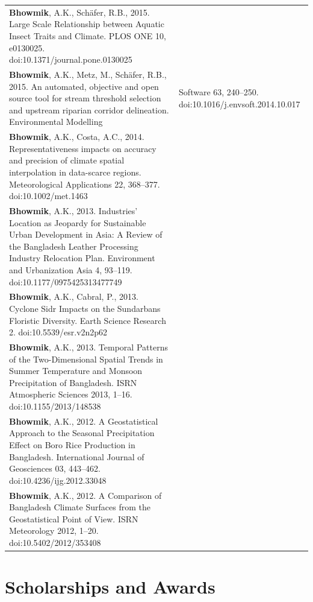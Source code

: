 \begin{table}[hp!]

\label{Table CV5a}

\begin{tabular}{>{\raggedright\arraybackslash}p{14.0cm}}

\textbf{Bhowmik}, A.K., Schäfer, R.B., 2015. Large Scale Relationship between Aquatic Insect Traits and Climate. PLOS ONE 10, e0130025. doi:10.1371/journal.pone.0130025\\[0.3cm]
\textbf{Bhowmik}, A.K., Metz, M., Schäfer, R.B., 2015. An automated, objective and open source tool for stream threshold selection and upstream riparian corridor delineation. Environmental Modelling & Software 63, 240–250. doi:10.1016/j.envsoft.2014.10.017\\[0.3cm]
\textbf{Bhowmik}, A.K., Costa, A.C., 2014. Representativeness impacts on accuracy and precision of climate spatial interpolation in data-scarce regions. Meteorological Applications 22, 368–377. doi:10.1002/met.1463\\[0.3cm]
\textbf{Bhowmik}, A.K., 2013. Industries’ Location as Jeopardy for Sustainable Urban Development in Asia: A Review of the Bangladesh Leather Processing Industry Relocation Plan. Environment and Urbanization Asia 4, 93–119. doi:10.1177/0975425313477749\\[0.3cm]
\textbf{Bhowmik}, A.K., Cabral, P., 2013. Cyclone Sidr Impacts on the Sundarbans Floristic Diversity. Earth Science Research 2. doi:10.5539/esr.v2n2p62\\[0.3cm]
\textbf{Bhowmik}, A.K., 2013. Temporal Patterns of the Two-Dimensional Spatial Trends in Summer Temperature and Monsoon Precipitation of Bangladesh. ISRN Atmospheric Sciences 2013, 1–16. doi:10.1155/2013/148538\\[0.3cm]
\textbf{Bhowmik}, A.K., 2012. A Geostatistical Approach to the Seasonal Precipitation Effect on Boro Rice Production in Bangladesh. International Journal of Geosciences 03, 443–462. doi:10.4236/ijg.2012.33048\\[0.3cm]
\textbf{Bhowmik}, A.K., 2012. A Comparison of Bangladesh Climate Surfaces from the Geostatistical Point of View. ISRN Meteorology 2012, 1–20. doi:10.5402/2012/353408

\end{tabular}

\end{table}


\section{Scholarships and Awards}

